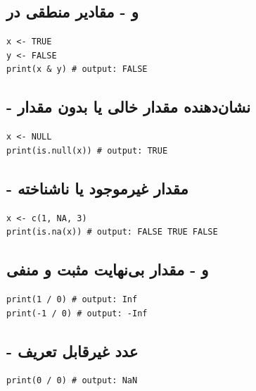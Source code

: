 \documentclass[11pt, a4paper, oneside]{book}
\begin{document}
			\subsection{و  - مقادیر منطقی  در }
				\begin{latin}
					\begin{lstlisting}[caption={\lr{TRUE, FALSE}}]
x <- TRUE
y <- FALSE
print(x & y) # output: FALSE
					\end{lstlisting}
				\end{latin}
				
			\subsection{ - نشان‌دهنده مقدار خالی یا بدون مقدار}
				\begin{latin}
					\begin{lstlisting}[caption={\lr{NULL}}]
x <- NULL
print(is.null(x)) # output: TRUE
					\end{lstlisting}
				\end{latin}
			
			\subsection{ - مقدار غیرموجود یا ناشناخته }
				\begin{latin}
					\begin{lstlisting}[caption={\lr{NA}}]
x <- c(1, NA, 3)
print(is.na(x)) # output: FALSE TRUE FALSE
					\end{lstlisting}
				\end{latin}
				
			\subsection{ و  - مقدار بی‌نهایت مثبت و منفی}
				\begin{latin}
					\begin{lstlisting}[caption={\lr{Inf, -Inf}}]
print(1 / 0) # output: Inf
print(-1 / 0) # output: -Inf
					\end{lstlisting}
				\end{latin}
				
			\subsection{ - عدد غیرقابل تعریف }
				\begin{latin}
					\begin{lstlisting}[caption={\lr{NaN}}]
print(0 / 0) # output: NaN
					\end{lstlisting}
				\end{latin}
				
\end{document}
